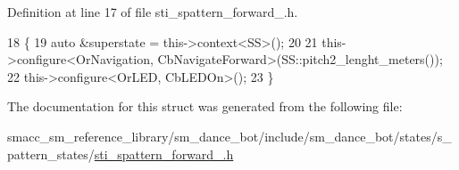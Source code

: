 Definition at line 17 of file sti\+\_\+spattern\+\_\+forward\+\_.\+h.


\begin{DoxyCode}
18   \{
19     \textcolor{keyword}{auto} &superstate = this->context<SS>();
20 
21     this->configure<OrNavigation, CbNavigateForward>(SS::pitch2\_lenght\_meters());
22     this->configure<OrLED, CbLEDOn>();
23   \}
\end{DoxyCode}


The documentation for this struct was generated from the following file\+:\begin{DoxyCompactItemize}
\item 
smacc\+\_\+sm\+\_\+reference\+\_\+library/sm\+\_\+dance\+\_\+bot/include/sm\+\_\+dance\+\_\+bot/states/s\+\_\+pattern\+\_\+states/\hyperlink{sti__spattern__forward__2_8h}{sti\+\_\+spattern\+\_\+forward\+\_.\+h}\end{DoxyCompactItemize}

